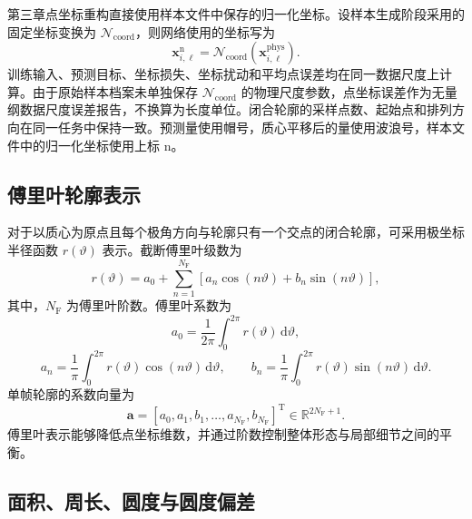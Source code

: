 第三章点坐标重构直接使用样本文件中保存的归一化坐标。设样本生成阶段采用的固定坐标变换为 $\mathcal{N}_{\mathrm{coord}}$，则网络使用的坐标写为
\begin{equation}
\boldsymbol{x}_{i,\ell}^{\mathrm n}
=
\mathcal{N}_{\mathrm{coord}}
\left(\boldsymbol{x}_{i,\ell}^{\mathrm{phys}}\right).
\label{eq:ch2_stored_coordinate_normalization}
\end{equation}
训练输入、预测目标、坐标损失、坐标扰动和平均点误差均在同一数据尺度上计算。由于原始样本档案未单独保存 $\mathcal{N}_{\mathrm{coord}}$ 的物理尺度参数，点坐标误差作为无量纲数据尺度误差报告，不换算为长度单位。闭合轮廓的采样点数、起始点和排列方向在同一任务中保持一致。预测量使用帽号，质心平移后的量使用波浪号，样本文件中的归一化坐标使用上标 $\mathrm n$。

\subsection{傅里叶轮廓表示}

对于以质心为原点且每个极角方向与轮廓只有一个交点的闭合轮廓，可采用极坐标半径函数 $r(\vartheta)$ 表示。截断傅里叶级数为
\begin{equation}
r(\vartheta)
=
a_0
+
\sum_{n=1}^{N_{\mathrm F}}
\left[
a_n\cos(n\vartheta)
+
b_n\sin(n\vartheta)
\right],
\label{eq:ch2_fourier_contour}
\end{equation}
其中，$N_{\mathrm F}$ 为傅里叶阶数。傅里叶系数为
\begin{equation}
a_0
=
\frac{1}{2\pi}
\int_0^{2\pi}
r(\vartheta)\,\mathrm d\vartheta,
\label{eq:ch2_fourier_a0}
\end{equation}
\begin{equation}
a_n
=
\frac{1}{\pi}
\int_0^{2\pi}
r(\vartheta)\cos(n\vartheta)\,\mathrm d\vartheta,
\qquad
b_n
=
\frac{1}{\pi}
\int_0^{2\pi}
r(\vartheta)\sin(n\vartheta)\,\mathrm d\vartheta.
\label{eq:ch2_fourier_coefficients}
\end{equation}
单帧轮廓的系数向量为
\begin{equation}
\boldsymbol{a}
=
\left[
a_0,a_1,b_1,\ldots,a_{N_{\mathrm F}},b_{N_{\mathrm F}}
\right]^{\mathrm T}
\in
\mathbb{R}^{2N_{\mathrm F}+1}.
\label{eq:ch2_fourier_vector}
\end{equation}
傅里叶表示能够降低点坐标维数，并通过阶数控制整体形态与局部细节之间的平衡\cite{kuhl1982elliptic}。

\subsection{面积、周长、圆度与圆度偏差}

